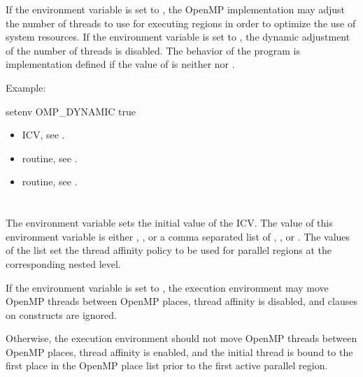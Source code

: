 If the environment variable is set to , the OpenMP implementation 
may adjust the number of threads to use for executing  regions 
in order to optimize the use of system resources. If the environment variable 
is set to , the dynamic adjustment of the number of threads is 
disabled. The behavior of the program is implementation defined if the value 
of  is neither  nor .

Example:
\begin{ompEnv}
setenv OMP_DYNAMIC true
\end{ompEnv}

\crossreferences
\begin{itemize}
\item {} ICV, see .

\item {} routine, see .

\item {} routine, see .
\end{itemize}



\section{}
\label{sec:OMP_PROC_BIND}
The  environment variable sets the initial value of 
the  ICV. The value of this environment variable is either 
, , or a comma separated list of , 
, or . The values of the list set the thread 
affinity policy to be used for parallel regions at the corresponding nested level.

If the environment variable is set to , the execution 
environment may move OpenMP threads between OpenMP places, thread 
affinity is disabled, and  clauses on  
constructs are ignored.

Otherwise, the execution environment should not move OpenMP threads between
OpenMP places, thread affinity is enabled, and the initial thread is bound 
to the first place in the OpenMP place list prior to the first active 
parallel region.

